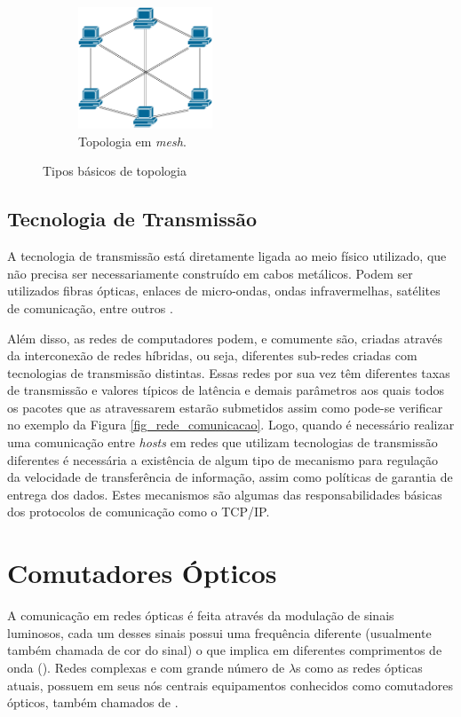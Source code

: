 \begin{figure}[t!]
\begin{subfigure}[t]{0.4\textwidth}
	\end{subfigure}
	~
	\begin{subfigure}[t]{0.4\textwidth}
		\centering
		\includegraphics[width=4cm]{./figuras/Topologia-Mesh.pdf} %
	\caption{Topologia em \emph{mesh}.}
	\label{fig_topologia_multiplo_mesh}
	\end{subfigure}
	\caption{Tipos básicos de topologia}
	\label{fig_topologia_multiplo}
\end{figure}

\subsection{Tecnologia de Transmissão}
A tecnologia de transmissão está diretamente ligada ao meio físico utilizado, que não precisa ser necessariamente construído em cabos metálicos. Podem ser utilizados fibras ópticas, enlaces de micro-ondas, ondas infravermelhas, satélites de comunicação, entre outros \cite{Book-Tanenbaum2003}. 

Além disso, as redes de computadores podem, e comumente são, criadas através da interconexão de redes híbridas, ou seja, diferentes sub-redes criadas com tecnologias de transmissão distintas. Essas redes por sua vez têm diferentes taxas de transmissão e valores típicos de latência e demais parâmetros aos quais todos os pacotes que as atravessarem estarão submetidos \cite{Book-Kurose2013} assim como pode-se verificar no exemplo da Figura \ref{fig_rede_comunicacao}. Logo, quando é necessário realizar uma comunicação entre \emph{hosts} em redes que utilizam tecnologias de transmissão diferentes é necessária a existência de algum tipo de mecanismo para regulação da velocidade de transferência de informação, assim como políticas de garantia de entrega dos dados. Estes mecanismos são algumas das responsabilidades básicas dos protocolos de comunicação como o TCP/IP.

\section{Comutadores Ópticos}
A comunicação em redes ópticas é feita através da modulação de sinais luminosos, cada um desses sinais possui uma frequência diferente (usualmente também chamada de cor do sinal) o que implica em diferentes comprimentos de onda (). Redes complexas e com grande número de $\lambda$s  como as redes ópticas atuais, possuem em seus nós centrais equipamentos conhecidos como comutadores ópticos, também chamados de . 

